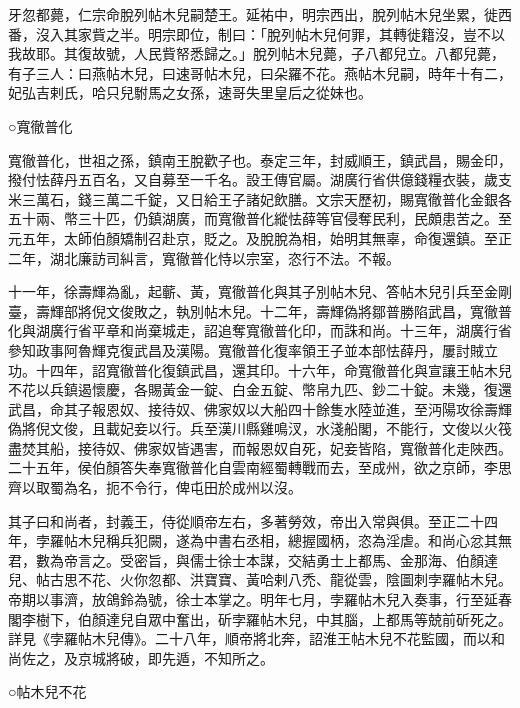 \begin{pinyinscope}
 牙忽都薨，仁宗命脫列帖木兒嗣楚王。延祐中，明宗西出，脫列帖木兒坐累，徙西番，沒入其家貲之半。明宗即位，制曰：「脫列帖木兒何罪，其轉徙籍沒，豈不以我故耶。其復故號，人民貲帑悉歸之。」脫列帖木兒薨，子八都兒立。八都兒薨，有子三人：曰燕帖木兒，曰速哥帖木兒，曰朵羅不花。燕帖木兒嗣，時年十有二，妃弘吉剌氏，哈只兒駙馬之女孫，速哥失里皇后之從妹也。



 ○寬徹普化



 寬徹普化，世祖之孫，鎮南王脫歡子也。泰定三年，封威順王，鎮武昌，賜金印，撥付怯薛丹五百名，又自募至一千名。設王傳官屬。湖廣行省供億錢糧衣裝，歲支米三萬石，錢三萬二千錠，又日給王子諸妃飲膳。文宗天歷初，賜寬徹普化金銀各五十兩、幣三十匹，仍鎮湖廣，而寬徹普化縱怯薛等官侵奪民利，民頗患苦之。至元五年，太師伯顏矯制召赴京，貶之。及脫脫為相，始明其無辜，命復還鎮。至正二年，湖北廉訪司糾言，寬徹普化恃以宗室，恣行不法。不報。



 十一年，徐壽輝為亂，起蘄、黃，寬徹普化與其子別帖木兒、答帖木兒引兵至金剛臺，壽輝部將倪文俊敗之，執別帖木兒。十二年，壽輝偽將鄒普勝陷武昌，寬徹普化與湖廣行省平章和尚棄城走，詔追奪寬徹普化印，而誅和尚。十三年，湖廣行省參知政事阿魯輝克復武昌及漢陽。寬徹普化復率領王子並本部怯薛丹，屢討賊立功。十四年，詔寬徹普化復鎮武昌，還其印。十六年，命寬徹普化與宣讓王帖木兒不花以兵鎮遏懷慶，各賜黃金一錠、白金五錠、幣帛九匹、鈔二十錠。未幾，復還武昌，命其子報恩奴、接待奴、佛家奴以大船四十餘隻水陸並進，至沔陽攻徐壽輝偽將倪文俊，且載妃妾以行。兵至漢川縣雞鳴汊，水淺船閣，不能行，文俊以火筏盡焚其船，接待奴、佛家奴皆遇害，而報恩奴自死，妃妾皆陷，寬徹普化走陜西。二十五年，侯伯顏答失奉寬徹普化自雲南經蜀轉戰而去，至成州，欲之京師，李思齊以取蜀為名，扼不令行，俾屯田於成州以沒。



 其子曰和尚者，封義王，侍從順帝左右，多著勞效，帝出入常與俱。至正二十四年，孛羅帖木兒稱兵犯闕，遂為中書右丞相，總握國柄，恣為淫虐。和尚心忿其無君，數為帝言之。受密旨，與儒士徐士本謀，交結勇士上都馬、金那海、伯顏達兒、帖古思不花、火你忽都、洪寶寶、黃哈剌八禿、龍從雲，陰圖刺孛羅帖木兒。帝期以事濟，放鴿鈴為號，徐士本掌之。明年七月，孛羅帖木兒入奏事，行至延春閣李樹下，伯顏達兒自眾中奮出，斫孛羅帖木兒，中其腦，上都馬等兢前斫死之。詳見《孛羅帖木兒傳》。二十八年，順帝將北奔，詔淮王帖木兒不花監國，而以和尚佐之，及京城將破，即先遁，不知所之。



 ○帖木兒不花




\end{pinyinscope}
